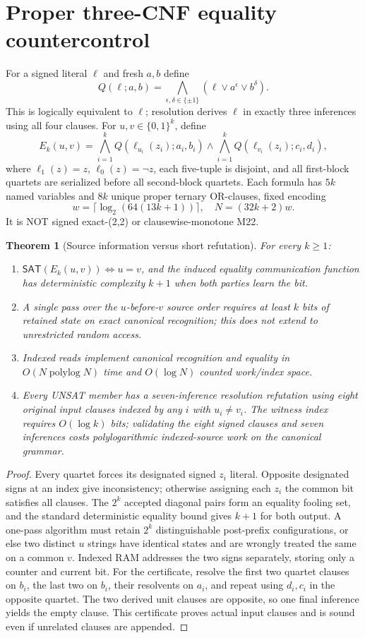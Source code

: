 \documentclass[11pt]{article}
\newtheorem{theorem}{Theorem}
\newcommand{\SAT}{\mathsf{SAT}}
\begin{document}
\section{Proper three-CNF equality countercontrol}
For a signed literal $\ell$ and fresh $a,b$ define
\[Q(\ell;a,b)=\bigwedge_{\epsilon,\delta\in\{\pm1\}}(\ell\vee a^\epsilon\vee b^\delta).\]
This is logically equivalent to $\ell$; resolution derives $\ell$ in exactly three inferences using all four clauses. For $u,v\in\{0,1\}^k$, define
\[E_k(u,v)=\bigwedge_{i=1}^k Q(\ell_{u_i}(z_i);a_i,b_i)\land\bigwedge_{i=1}^kQ(\ell_{v_i}(z_i);c_i,d_i),\]
where $\ell_1(z)=z$, $\ell_0(z)=\neg z$, each five-tuple is disjoint, and all first-block quartets are serialized before all second-block quartets. Each formula has $5k$ named variables and $8k$ unique proper ternary OR-clauses, fixed encoding
\[w=\lceil\log_2(64(13k+1))\rceil,\quad N=(32k+2)w.\]
It is NOT signed exact-(2,2) or clausewise-monotone M22.
\begin{theorem}[Source information versus short refutation]
For every $k\ge1$:
\begin{enumerate}
\item $\SAT(E_k(u,v))\Leftrightarrow u=v$, and the induced equality communication function has deterministic complexity $k+1$ when both parties learn the bit.
\item A single pass over the $u$-before-$v$ source order requires at least $k$ bits of retained state on exact canonical recognition; this does not extend to unrestricted random access.
\item Indexed reads implement canonical recognition and equality in $O(N\operatorname{polylog}N)$ time and $O(\log N)$ counted work/index space.
\item Every UNSAT member has a seven-inference resolution refutation using eight original input clauses indexed by any $i$ with $u_i\neq v_i$. The witness index requires $O(\log k)$ bits; validating the eight signed clauses and seven inferences costs polylogarithmic indexed-source work on the canonical grammar.
\end{enumerate}
\end{theorem}
\begin{proof}
Every quartet forces its designated signed $z_i$ literal. Opposite designated signs at an index give inconsistency; otherwise assigning each $z_i$ the common bit satisfies all clauses. The $2^k$ accepted diagonal pairs form an equality fooling set, and the standard deterministic equality bound gives $k+1$ for both output. A one-pass algorithm must retain $2^k$ distinguishable post-prefix configurations, or else two distinct $u$ strings have identical states and are wrongly treated the same on a common $v$. Indexed RAM addresses the two signs separately, storing only a counter and current bit. For the certificate, resolve the first two quartet clauses on $b_i$, the last two on $b_i$, their resolvents on $a_i$, and repeat using $d_i,c_i$ in the opposite quartet. The two derived unit clauses are opposite, so one final inference yields the empty clause. This certificate proves actual input clauses and is sound even if unrelated clauses are appended.
\end{proof}
\end{document}
